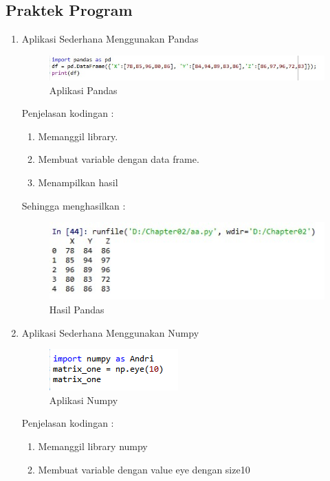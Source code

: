 \subsection{Praktek Program}
\begin{enumerate}
\item Aplikasi Sederhana Menggunakan Pandas
	\begin{figure}[ht]
	\centering
	\includegraphics[scale=0.5]{figures/AFS/praktek1.jpg}
	\caption{Aplikasi Pandas}
	\label{contoh}
	\end{figure}
	\par Penjelasan kodingan :
		\begin{enumerate}
		\item Memanggil library.
		\item Membuat variable dengan data frame.
		\item Menampilkan hasil
		\end{enumerate}
	\par Sehingga menghasilkan :
	\begin{figure}[ht]
	\centering
	\includegraphics[scale=0.5]{figures/AFS/praktek2.jpg}
	\caption{Hasil Pandas}
	\label{contoh}
	\end{figure}
\item Aplikasi Sederhana Menggunakan Numpy
	\begin{figure}[ht]
	\centering
	\includegraphics[scale=0.5]{figures/AFS/praktek3.png}
	\caption{Aplikasi Numpy}
	\label{contoh}
	\end{figure}
	\par Penjelasan kodingan :
		\begin{enumerate}
		\item Memanggil library numpy
		\item Membuat variable dengan value eye dengan size10

\end{enumerate}
\end{enumerate}
